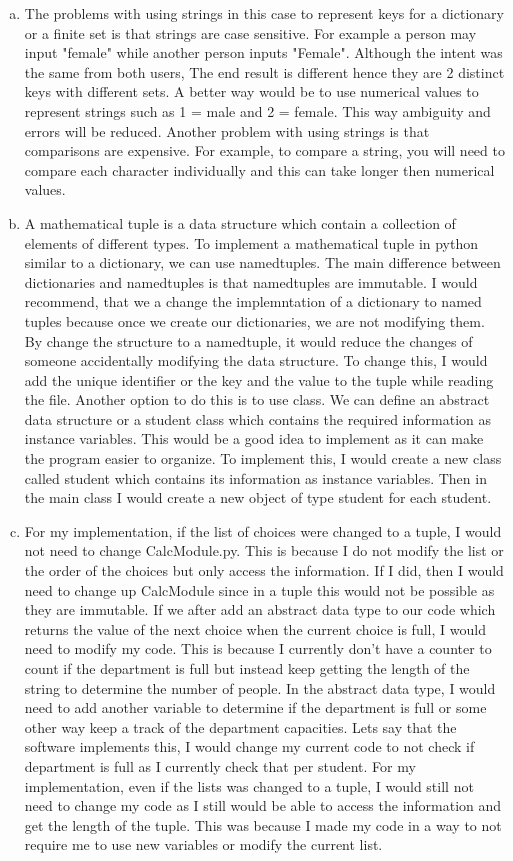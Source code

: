 \documentclass[12pt]{article}
\begin{document}
\begin{enumerate}[(a)]
\item The problems with using strings in this case to represent keys for a dictionary or a finite set is that strings are case sensitive. For example a person may input "female" while another person inputs "Female". Although the intent was the same from both users, The end result is different hence they are 2 distinct keys with different sets. A better way would be to use numerical values to represent strings such as 1 = male and 2 = female. This way ambiguity and errors will be reduced. Another problem with using strings is that comparisons are expensive. For example, to compare a string, you will need to compare each character individually and this can take longer then numerical values. 

\item A mathematical tuple is a data structure which contain a collection of elements of different types. To implement a mathematical tuple in python similar to a dictionary, we can use namedtuples. The main difference between dictionaries and namedtuples is that namedtuples are immutable. I would recommend, that we a change the implemntation of a dictionary to named tuples because once we create our dictionaries, we are not modifying them. By change the structure to a namedtuple, it would reduce the changes of someone accidentally modifying the data structure. To change this, I would add the unique identifier or the key and the value to the tuple while reading the file. Another option to do this is to use class. We can define an abstract data structure or a student class which contains the required information as instance variables. This would be a good idea to implement as it can make the program easier to organize. To implement this, I would create a new class called student which contains its information as instance variables. Then in the main class I would create a new object of type student for each student.

\item For my implementation, if the list of choices were changed to a tuple, I would not need to change CalcModule.py. This is because I do not modify the list or the order of the choices but only access the information. If I did, then I would need to change up CalcModule since in a tuple this would not be possible as they are immutable. If we after add an abstract data type to our code which returns the value of the next choice when the current choice is full, I would need to modify my code. This is because I currently don't have a counter to count if the department is full but instead keep getting the length of the string to determine the number of people. In the abstract data type, I would need to add another variable to determine if the department is full or some other way keep a track of the department capacities. Lets say that the software implements this, I would change my current code to not check if department is full as I currently check that per student. For my implementation, even if the lists was changed to a tuple, I would still not need to change my code as I still would be able to access the information and get the length of the tuple. This was because I made my code in a way to not require me to use new variables or modify the current list. 


\end{enumerate}
\end{document}
